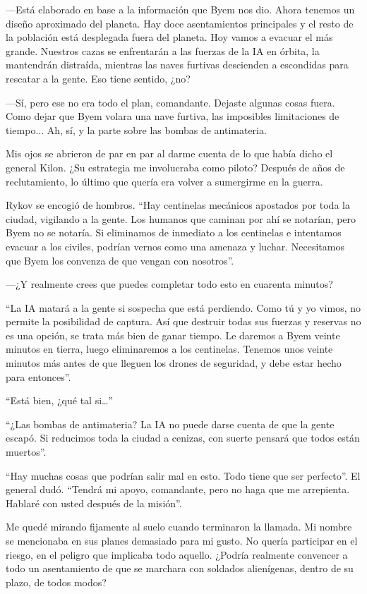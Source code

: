 —Está elaborado en base a la información que Byem nos dio. Ahora tenemos un diseño aproximado del planeta. Hay doce asentamientos principales y el resto de la población está desplegada fuera del planeta. Hoy vamos a evacuar el más grande. Nuestros cazas se enfrentarán a las fuerzas de la IA en órbita, la mantendrán distraída, mientras las naves furtivas descienden a escondidas para rescatar a la gente. Eso tiene sentido, ¿no?

—Sí, pero ese no era todo el plan, comandante. Dejaste algunas cosas fuera. Como dejar que Byem volara una nave furtiva, las imposibles limitaciones de tiempo... Ah, sí, y la parte sobre las bombas de antimateria.

Mis ojos se abrieron de par en par al darme cuenta de lo que había dicho el general Kilon. ¿Su estrategia me involucraba como piloto? Después de años de reclutamiento, lo último que quería era volver a sumergirme en la guerra.

Rykov se encogió de hombros. “Hay centinelas mecánicos apostados por toda la ciudad, vigilando a la gente. Los humanos que caminan por ahí se notarían, pero Byem no se notaría. Si eliminamos de inmediato a los centinelas e intentamos evacuar a los civiles, podrían vernos como una amenaza y luchar. Necesitamos que Byem los convenza de que vengan con nosotros”.

—¿Y realmente crees que puedes completar todo esto en cuarenta minutos?

“La IA matará a la gente si sospecha que está perdiendo. Como tú y yo vimos, no permite la posibilidad de captura. Así que destruir todas sus fuerzas y reservas no es una opción, se trata más bien de ganar tiempo. Le daremos a Byem veinte minutos en tierra, luego eliminaremos a los centinelas. Tenemos unos veinte minutos más antes de que lleguen los drones de seguridad, y debe estar hecho para entonces”.

“Está bien, ¿qué tal si…”

“¿Las bombas de antimateria? La IA no puede darse cuenta de que la gente escapó. Si reducimos toda la ciudad a cenizas, con suerte pensará que todos están muertos”.

“Hay muchas cosas que podrían salir mal en esto. Todo tiene que ser perfecto”. El general dudó. “Tendrá mi apoyo, comandante, pero no haga que me arrepienta. Hablaré con usted después de la misión”.

Me quedé mirando fijamente al suelo cuando terminaron la llamada. Mi nombre se mencionaba en sus planes demasiado para mi gusto. No quería participar en el riesgo, en el peligro que implicaba todo aquello. ¿Podría realmente convencer a todo un asentamiento de que se marchara con soldados alienígenas, dentro de su plazo, de todos modos?

